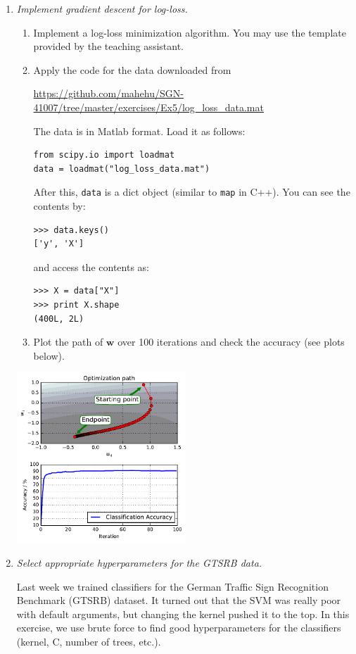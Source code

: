 \documentclass[a4paper,12pt]{scrartcl}
\newcommand{\w}{\mathbf{ w}}
\newcommand{\python}{{\fbox{\texttt{\bfseries python}}\quad}}
\begin{document}
\begin{enumerate}
\item \python \emph{Implement gradient descent for log-loss.}

\begin{enumerate}
\item Implement a log-loss minimization algorithm. You may use the template provided by the
teaching assistant.
\item Apply the code for the data downloaded from

\url{https://github.com/mahehu/SGN-41007/tree/master/exercises/Ex5/log_loss_data.mat}

The data is in Matlab format. Load it as follows:
\begin{verbatim}
from scipy.io import loadmat
data = loadmat("log_loss_data.mat")
\end{verbatim}

After this, \verb+data+ is a dict object (similar to \verb+map+ in C++).
You can see the contents by:
\begin{verbatim}
>>> data.keys()
['y', 'X']
\end{verbatim}
and access the contents as:
\begin{verbatim}
>>> X = data["X"]
>>> print X.shape
(400L, 2L)
\end{verbatim}

\item Plot the path of $\w$ over 100 iterations and check the accuracy (see plots below).

\end{enumerate}

\centerline{\includegraphics[width=0.5\textwidth]{log_loss_minimization.pdf}}

\item \python \emph{Select appropriate hyperparameters for the GTSRB data.}

Last week we trained classifiers for the German Traffic Sign
Recognition Benchmark (GTSRB) dataset. It turned out that the SVM was
really poor with default arguments, but changing the kernel pushed it
to the top. In this exercise, we use brute force to find good hyperparameters
for the classifiers (kernel, C, number of trees, etc.).


\end{enumerate}
\end{document}
